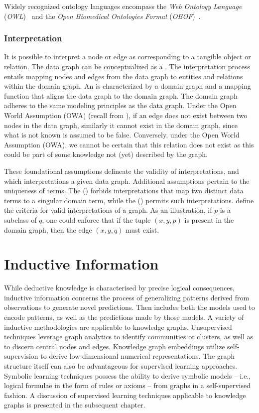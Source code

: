 Widely recognized ontology languages encompass the \textit{Web Ontology Language} (\textit{OWL})~\cite{Hitzler2014OWLPrimer} and the \textit{Open Biomedical Ontologies Format} (\textit{OBOF})~\cite{Mungall2012OBOF}.

\subsubsection{Interpretation}
It is possible to interpret a node or edge as corresponding to a tangible object or relation. The data graph can be conceptualized as a . The interpretation process entails mapping nodes and edges from the data graph to entities and relations within the domain graph. An  is characterized by a domain graph and a mapping function that aligns the data graph to the domain graph. The domain graph adheres to the same modeling principles as the data graph. Under the Open World Assumption (OWA) (recall from ), if an edge does not exist between two nodes in the data graph, similarly it cannot exist in the domain graph, since what is not known is assumed to be false. Conversely, under the Open World Assumption (OWA), we cannot be certain that this relation does not exist as this could be part of some knowledge not (yet) described by the graph. 

These foundational assumptions delineate the validity of interpretations, and which interpretations  a given data graph. Additional assumptions pertain to the uniqueness of terms. The  () forbids interpretations that map two distinct data terms to a singular domain term, while the  () permits such interpretations.
 define the criteria for valid interpretations of a graph. As an illustration, if $p$ is a subclass of $q$, one could enforce that if the tuple $(x,y,p)$ is present in the domain graph, then the edge $(x,y,q)$ must exist.

\section{Inductive Information}\label{inductive-information}
While deductive knowledge is characterised by precise logical consequences, inductive information concerns the process of generalizing patterns derived from observations to generate novel predictions. Then  includes both the models used to encode patterns, as well as the predictions made by those models.
A variety of inductive methodologies are applicable to knowledge graphs. Unsupervised techniques leverage graph analytics to identify communities or clusters, as well as to discern central nodes and edges. Knowledge graph embeddings utilize self-supervision to derive low-dimensional numerical representations. The graph structure itself can also be advantageous for supervised learning approaches. Symbolic learning techniques possess the ability to derive symbolic models – i.e., logical formulae in the form of rules or axioms – from graphs in a self-supervised fashion. A discussion of supervised learning techniques applicable to knowledge graphs is presented in the subsequent chapter.

